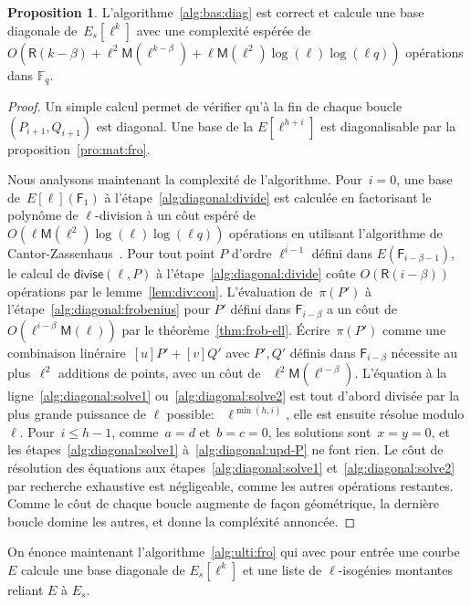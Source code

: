 \documentclass[10pt,a4paper]{book}
\theoremstyle{plain}
\theoremstyle{definition}
\theoremstyle{definition}
\theoremstyle{definition}
\newtheorem{prop}[thm]{Proposition}
\theoremstyle{definition}
\theoremstyle{remark}
\theoremstyle{remark}
\theoremstyle{definition}
\begin{document}
\begin{prop}\label{pro:alg:diagonal}
L'algorithme~\ref{alg:bas:diag} est correct et calcule une base diagonale 
de~$E_s[\ell^k]$ avec une complexité espérée de
$O(\mathsf{R}(k-\beta) + \ell^2\mathsf{M}(\ell^{k-\beta}) + \ell\mathsf{M}(\ell^2)\log(\ell)\log(\ell q))$ 
opérations dans $\mathbb{F}_q$.
\end{prop}

\begin{proof}
Un simple calcul permet de vérifier qu'à la fin de chaque boucle
$(P_{i+1},Q_{i+1})$ est diagonal. Une base de la $E[\ell^{h+i}]$ est 
diagonalisable par la proposition~\ref{pro:mat:fro}.

Nous analysons maintenant la complexité de l'algorithme.
Pour~$i = 0$, une base de~$E[\ell](\mathsf{F}_1)$ à l'étape~\ref{alg:diagonal:divide}
est calculée en factorisant le polynôme de $\ell$-division
à un côut espéré de $O(\ell\mathsf{M}(\ell^2)\log(\ell)\log(\ell q))$
opérations en utilisant l'algorithme de Cantor-Zassenhaus~\cite[Chapter 14.5]{vzGJG03}.
  Pour tout point $P$ d'ordre $\ell^{i-1}$ défini dans $E(\mathsf{F}_{i-\beta-1})$, 
  le calcul de   $\mathsf{divise}(\ell, P)$ à l'étape~\ref{alg:diagonal:divide}
  coûte $O(\mathsf{R}(i-\beta))$ opérations par le lemme~\ref{lem:div:cou}.
  L'évaluation de~$\pi(P')$ à l'étape~\ref{alg:diagonal:frobenius} pour $P'$ 
  défini dans $\mathsf{F}_{i-\beta}$ a un côut
  de~$O(\ell^{i-\beta}\mathsf{M}(\ell))$ par le théorème~\ref{thm:frob-ell}.
  \'Ecrire~$\pi(P')$ comme une combinaison linéraire~$[u] P' + [v] Q'$ avec 
  $P',Q'$ définis dans $\mathsf{F}_{i-\beta}$ nécessite au
  plus~$\ell^2$ additions de points, avec un côut de ~$\ell^2
  \mathsf{M}(\ell^{i-\beta})$.
L'équation à la ligne~\ref{alg:diagonal:solve1} ou~\ref{alg:diagonal:solve2}
est tout d'abord divisée par la plus grande puissance de $\ell$ possible:
~$\ell^{\min (h, i)}$, elle est ensuite résolue modulo $\ell$.
Pour~$i \leqslant h-1$, comme~$a = d$ et~$b = c = 0$, les solutions sont~$x = y
 = 0$, et les étapes~\ref{alg:diagonal:solve1} à~\ref{alg:diagonal:upd-P} ne 
font rien.
  Le côut de résolution des équations aux étapes~\ref{alg:diagonal:solve1}
  et~\ref{alg:diagonal:solve2} par recherche exhaustive est négligeable, comme
  les autres opérations restantes. Comme le côut de chaque boucle augmente
  de façon géométrique, la dernière boucle domine les autres, et donne la
  compléxité annoncée.
\end{proof}

On énonce maintenant l'algorithme~\ref{alg:ulti:fro} qui avec pour entrée une 
courbe $E$ calcule une base diagonale de $E_s[\ell^k]$ et une liste de 
$\ell$-isogénies montantes reliant $E$ à $E_s$.
\end{document}
